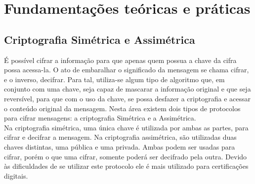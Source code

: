 \documentclass{article}
\begin{document}
	\section {Fundamentações teóricas e práticas}
		\subsection{Criptografia Simétrica e Assimétrica}
			\begin{justify}
			

	 			\hspace{2cm} É possível cifrar a informação para que apenas quem possua a chave da cifra possa acessa-la. O ato de embaralhar o significado da mensagem se chama cifrar, e o inverso, decifrar. Para tal, utiliza-se algum tipo de algoritmo que, em conjunto com uma chave, seja capaz de mascarar a informação original e que seja reversível, para que com o uso da chave, se possa desfazer a criptografia e acessar o conteúdo original da mensagem. Nesta área existem dois tipos de protocolos para cifrar mensagens: a criptografia Simétrica e a Assimétrica. \\
				\hspace*{2cm}Na criptografia simétrica, uma única chave é utilizada por ambas as partes, para cifrar e decifrar a mensagem. Na criptografia assimétrica, são utilizadas duas chaves distintas, uma pública e uma privada. Ambas podem ser usadas para cifrar, porém o que uma cifrar, somente poderá ser decifrado pela outra. Devido às dificuldades de se utilizar este protocolo ele é mais utilizado para certificações digitais.
					
			\end{justify}
\end{document}
